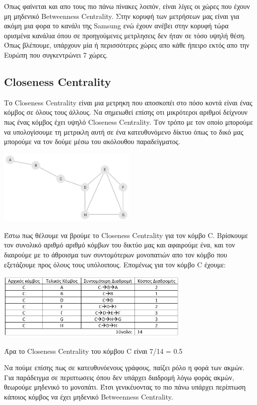 \documentclass[12pt]{article}
\begin{document}
	\vspace{12pt}
	Όπως φαίνεται και απο τους πιο πάνω πίνακες λοιπόν, είναι λίγες οι χώρες που έχουν μη μηδενικό Betweenness Centrality. Στην κορυφή των μετρήσεων μας είναι για ακόμη μια φορα το κανάλι της Samsung ενώ έχουν ανέβει στην κορυφή τώρα ορισμένα κανάλια όπου σε προηγούμενες μετρλησεις δεν ήταν σε τόσο υψηλή θέση. %
	Όπως βλέπουμε, υπάρχουν μία ή περισσότερες χώρες απο κάθε ήπειρο εκτός απο την Ευρώπη που συγκεντρώνει 7 χώρες.
	
	\newpage
	\subsection{Closeness Centrality}
	Το Closeness Centrality είναι μια μετρηκη που αποσκοπέι στο πόσο κοντά είναι ένας κόμβος σε όλους τους άλλους. Να σημειωθεί επίσης οτι μικρότεροι αριθμοί δείχνουν πως ένας κόμβος έχει υψηλό Closeness Centrality. Τον τρόπο με τον οποίο μπορούμε να υπολογίσουμε τη μετρικλη αυτή σε ένα κατευθυνόμενο δίκτυο όπως το δικό μας μπορούμε να τον δούμε μέσω του ακόλουθου παραδείγματος.
	\begin{center}
		\includegraphics[width=0.5\textwidth]{photos-files/section7/closeness_centrality_example.JPG}
	\end{center}
	Έστω πως θέλουμε να βρούμε το Closeness Centrality για τον κόμβο C. Βρίσκουμε τον συνολικό αριθμό αριθμό κόμβων του δικτύο μας και αφαιρούμε ένα, και τον διαιρούμε με το άθροισμα των συντομότερων μονοπατιών απο τον κόμβο που εξετάζουμε προς όλους τους υπόλοιπους. Επομένως για τον κόμβο C έχουμε:
	\begin{center}
		\includegraphics[width=0.7\textwidth]{photos-files/section7/array_of_example.JPG}
	\end{center}
	Άρα το Closeness Centrality του κόμβου C είναι 7/14 = 0.5
	\par
	Να πούμε επίσης πως σε κατευθυνόενους γράφους, παίζει ρόλο η φορά των ακμών. Για παράδειγμα σε περιπτωσεις όπου δεν υπάρχει διαδρομή λόγω φοράς ακμών, θεωρούμε μηδενικό το μονοπάτι. Έτσι γενικέυοντας το πιο πάνω υπάρχει περίπτωση κάποιος κόμβος να έχει μηδενικό Betweenness Centrality.
	
\end{document}
